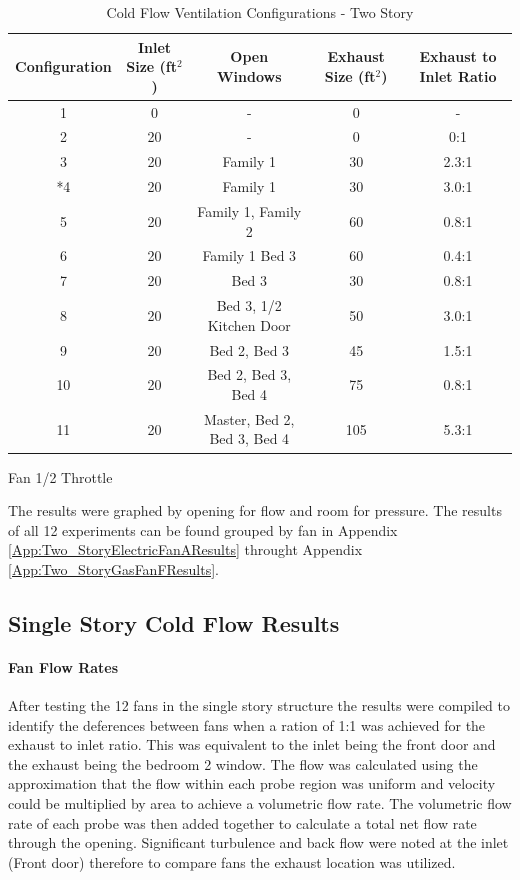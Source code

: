 \documentclass{article}
\begin{document}
\begin{table} [H]
	\caption{Cold Flow Ventilation Configurations - Two Story}
	\begin{tabular}{|c|c|c|c|c|}
		\hline
		Configuration & Inlet Size (ft$^2$) & Open Windows & Exhaust Size (ft$^2$) & Exhaust to Inlet Ratio \\ \hline \hline
		1 & 0 & - & 0 & - \\ \hline
		2 & 20 & - & 0 & 0:1 \\ \hline
		3 & 20 & Family 1 & 30 & 2.3:1 \\ \hline
		*4 & 20 & Family 1 & 30 & 3.0:1 \\ \hline
		5 & 20 & Family 1, Family 2 & 60 & 0.8:1 \\ \hline
		6 & 20 & Family 1 Bed 3 & 60 & 0.4:1 \\ \hline
		7 & 20 & Bed 3 & 30 & 0.8:1 \\ \hline
		8 & 20 & Bed 3, 1/2 Kitchen Door & 50 & 3.0:1 \\ \hline
		9 & 20 & Bed 2, Bed 3 & 45 & 1.5:1 \\ \hline
		10 & 20 & Bed 2, Bed 3, Bed 4 & 75 & 0.8:1 \\ \hline
		11 & 20 & Master, Bed 2, Bed 3, Bed 4 & 105 & 5.3:1 \\ \hline
	\end{tabular}
	\begin{tablenotes}
	\item *Fan 1/2 Throttle
	\end{tablenotes}
	\label{tab:ColdFlowConfig_TwoStory}
\end{table}

The results were graphed by opening for flow and room for pressure. The results of all 12 experiments can be found grouped by fan in Appendix \ref{App:Two_StoryElectricFanAResults} throught Appendix \ref{App:Two_StoryGasFanFResults}. 

\subsection{Single Story Cold Flow Results}

\paragraph{Fan Flow Rates} \mbox{}

After testing the 12 fans in the single story structure the results were compiled to identify the deferences between fans when a ration of 1:1 was achieved for the exhaust to inlet ratio. This was equivalent to the inlet being the front door and the exhaust being the bedroom 2 window.  The flow was calculated using the approximation that the flow within each probe region was uniform and velocity could be multiplied by area to achieve a volumetric flow rate. The volumetric flow rate of each probe was then added together to calculate a total net flow rate through the opening. Significant turbulence and back flow were noted at the inlet (Front door) therefore to compare fans the exhaust location was utilized. 
\end{document}
